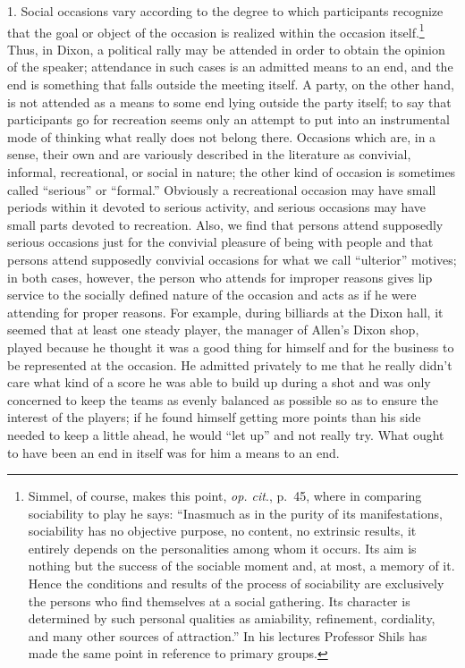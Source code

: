 \documentclass[twoside,symmetric,nobib,justified]{tufte-book}
\begin{document}
1. Social occasions vary according to the degree to which participants
recognize that the goal or object of the occasion is realized within the
occasion itself.\footnote{Simmel, of course, makes this point, \emph{op.
  cit}., p.~45, where in comparing sociability to play he says:
  ``Inasmuch as in the purity of its manifestations, sociability has no
  objective purpose, no content, no extrinsic results, it entirely
  depends on the personalities among whom it occurs. Its aim is nothing
  but the success of the sociable moment and, at most, a memory of it.
  Hence the conditions and results of the process of sociability are
  exclusively the persons who find themselves at a social gathering. Its
  character is determined by such personal qualities as amiability,
  refinement, cordiality, and many other sources of attraction.'' In his
  lectures Professor Shils has made the same point in reference to
  primary groups.} Thus, in Dixon, a political rally may be attended in
order to obtain the opinion of the speaker; attendance in such cases is
an admitted means to an end, and the end is something that falls outside
the meeting itself. A party, on the other hand, is not attended as a
means to some end lying outside the party itself; to say that
participants go for recreation seems only an attempt to put into an
instrumental mode of thinking what really does not belong there.
Occasions which are, in a sense, their own and are variously described
in the literature as convivial, informal, recreational, or social in
nature; the other kind of occasion is sometimes called ``serious'' or
``formal.'' Obviously a recreational occasion may have small periods
within it devoted to serious activity, and serious occasions may have
small parts devoted to recreation. Also, we find that persons attend
supposedly serious occasions just for the convivial pleasure of being
with people and that persons attend supposedly convivial occasions for
what we call ``ulterior'' motives; in both cases, however, the person
who attends for improper reasons gives lip service to the socially
defined nature of the occasion and acts as if he were attending for
proper reasons. For example, during billiards at the Dixon hall, it
seemed that at least one steady player, the manager of Allen's Dixon
shop, played because he thought it was a good thing for himself and for
the business to be represented at the occasion. He admitted privately to
me that he really didn't care what kind of a score he was able to build
up during a shot and was only concerned to keep the teams as evenly
balanced as possible so as to ensure the interest of the players; if he
found himself getting more points than his side needed to keep a little
ahead, he would ``let up'' and not really try. What ought to have been
an end in itself was for him a means to an end.
\end{document}
